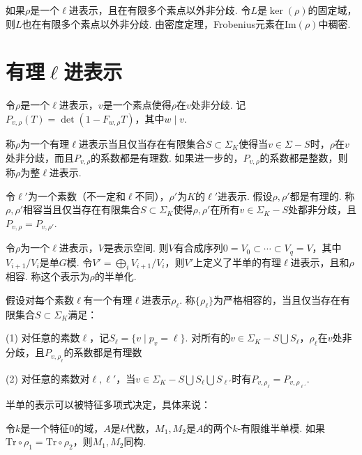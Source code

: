 \begin{crem}
    如果$\rho$是一个$\ell$进表示，且在有限多个素点以外非分歧. 令$L$是$\ker(\rho)$的固定域，则$L$也在有限多个素点以外非分歧. 由\Chebotarev 密度定理，Frobenius元素在$\mathrm{Im}(\rho)$中稠密.
\end{crem}

\section{有理\texorpdfstring{$\ell$}{ELL}进表示}

令$\rho$是一个$\ell$进表示，$v$是一个素点使得$\rho$在$v$处非分歧. 记$P_{v, \rho}(T) = \det (1 - F_{w, \rho}T)$，其中$w\mid v$.

\begin{cdef}
    称$\rho$为一个有理$\ell$进表示当且仅当存在有限集合$S\subset \Sigma_K$使得当$v\in \Sigma - S$时，$\rho$在$v$处非分歧，而且$P_{v, \rho}$的系数都是有理数. 如果进一步的，$P_{v,\rho}$的系数都是整数，则称$\rho$为整$\ell$进表示.
\end{cdef}

\begin{cdef}
    令$\ell'$为一个素数（不一定和$\ell$不同），$\rho'$为$K$的$\ell'$进表示. 假设$\rho, \rho'$都是有理的. 称$\rho, \rho'$相容当且仅当存在有限集合$S\subset \Sigma_K$使得$\rho, \rho'$在所有$v\in \Sigma_K - S$处都非分歧，且$P_{v,\rho} = P_{v, \rho'}$.
\end{cdef}

令$\rho$为一个$\ell$进表示，$V$是表示空间. 则$V$有合成序列$0 = V_0\subset \cdots \subset V_q = V$，其中$V_{i+1}/V_i$是单$G$模. 令$V' = \bigoplus_i V_{i+1}/V_i$，则$V'$上定义了半单的有理$\ell$进表示，且和$\rho$相容. 称这个表示为$\rho$的半单化.

\begin{cdef}
    假设对每个素数$\ell$有一个有理$\ell$进表示$\rho_{\ell}$. 称$\{\rho_{\ell}\}$为严格相容的，当且仅当存在有限集合$S\subset \Sigma_K$满足：

    (1) 对任意的素数$\ell$，记$S_{\ell} = \{v\mid p_v = \ell\}$. 对所有的$v\in \Sigma_K - S\bigcup S_{\ell}$，$\rho_{\ell}$在$v$处非分歧，且$P_{v, \rho_{\ell}}$的系数都是有理数

    (2) 对任意的素数对$\ell, \ell'$，当$v\in \Sigma_K - S\bigcup S_{\ell}\bigcup S_{\ell'}$时有$P_{v, \rho_{\ell}} = P_{v, \rho_{\ell'}}$.
\end{cdef}

半单的表示可以被特征多项式决定，具体来说：

\begin{clem}
    令$k$是一个特征$0$的域，$A$是$k$代数，$M_1, M_2$是$A$的两个$k$-有限维半单模. 如果$\mathrm{Tr}\circ \rho_1 = \mathrm{Tr}\circ \rho_2$，则$M_1, M_2$同构.
\end{clem}

